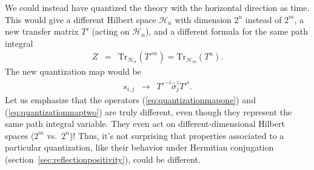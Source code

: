\documentclass[11pt]{ws-rv9x6}
\newcommand\be{\begin{eqnarray}}
\newcommand\ee{\end{eqnarray}}
\newcommand\<\langle
\renewcommand\>\rangle
\renewcommand\.{\cdot}
\newcommand\s\sigma
\newcommand\cH{\mathcal{H}}
\newcommand\Tr{\mathrm{Tr}}
\begin{document}
\begin{appendix}
We could instead have quantized the theory with the horizontal direction as time.  This would give a different Hilbert space $\cH_n$ with dimension $2^n$ instead of $2^m$, a new transfer matrix $T'$ (acting on $\cH_n$), and a different formula for the same path integral
\be
Z &=& \Tr_{\cH_n}(T'^m)=\Tr_{\cH_m}(T^n).
\ee
The new quantization map would be
\be
\label{eq:quantizationmaptwo}
s_{i,j} &\to& T'^{-i} \widehat \s_j^z T'^i.
\ee
Let us emphasize that the operators (\ref{eq:quantizationmapone}) and (\ref{eq:quantizationmaptwo}) are truly different, even though they represent the same path integral variable.  They even act on different-dimensional Hilbert spaces ($2^m$ vs.\ $2^n$)!  Thus, it's not surprising that properties associated to a particular quantization, like their behavior under Hermitian conjugation (section~\ref{sec:reflectionpositivity}), could be different.

\vspace{0.2in}

\end{appendix}
\end{document}
